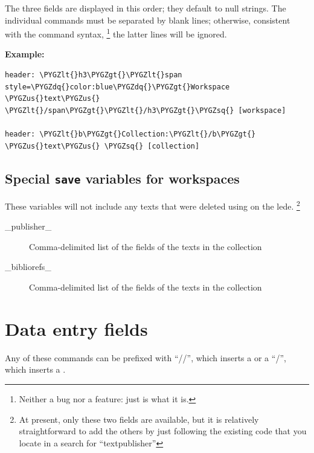 \documentclass[letterpaper,10pt,english]{sphinxmanual}
\def\PYGZus{\char`\_}
\def\PYGZlt{\char`\<}
\def\PYGZgt{\char`\>}
\def\PYGZsq{\char`\'}
\def\PYGZdq{\char`\"}
\renewcommand\PYGZsq{\textquotesingle}
\begin{document}
The three fields are displayed in this order; they default to null strings.
The individual  commands must be separated by blank lines; otherwise,
consistent with the command syntax, \footnote{
Neither a bug nor a feature: just is what it is.
} the latter lines will be ignored.

\textbf{Example:}

\begin{Verbatim}[commandchars=\\\{\}]
header: \PYGZlt{}h3\PYGZgt{}\PYGZlt{}span style=\PYGZdq{}color:blue\PYGZdq{}\PYGZgt{}Workspace \PYGZus{}text\PYGZus{} \PYGZlt{}/span\PYGZgt{}\PYGZlt{}/h3\PYGZgt{}\PYGZsq{} [workspace]

header: \PYGZlt{}b\PYGZgt{}Collection:\PYGZlt{}/b\PYGZgt{} \PYGZus{}text\PYGZus{} \PYGZsq{} [collection]
\end{Verbatim}


\subsection{Special \texttt{save} variables for workspaces}
\label{forms:special-save-variables-for-workspaces}
These variables will not include any texts that were deleted using
 on the lede. \footnote{
At present, only these two fields are available, but it is relatively
straightforward to add the others by just following the existing
code that you locate in a search for “textpublisher”
}
\begin{description}
\item[{\_publisher\_}] \leavevmode
Comma-delimited list of the  fields of the texts in
the collection

\item[{\_bibliorefs\_}] \leavevmode
Comma-delimited list of the  fields of the texts in
the collection

\end{description}


\section{Data entry fields}
\label{forms:data-entry-fields}
Any of these commands can be prefixed with “//”, which inserts a 
or a “/”, which inserts a .
\end{document}
